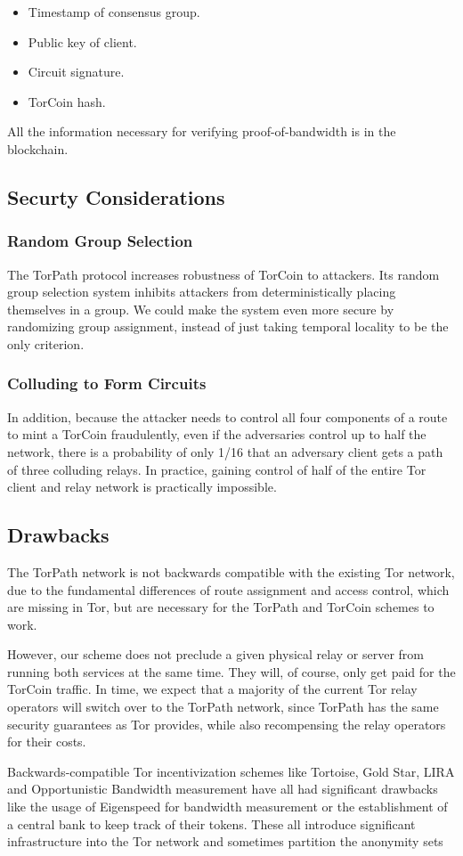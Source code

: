 \begin{itemize}
\item Timestamp of consensus group.
\item Public key of client.
\item Circuit signature.
\item TorCoin hash.
\end{itemize}

All the information necessary for verifying proof-of-bandwidth is in the blockchain. 

\subsection{Securty Considerations}

\subsubsection{Random Group Selection}
The TorPath protocol increases robustness of TorCoin to attackers. Its random group selection system inhibits attackers from deterministically placing themselves in a group. We could make the system even more secure by randomizing group assignment, instead of just taking temporal locality to be the only criterion.

\subsubsection{Colluding to Form Circuits}
In addition, because the attacker needs to control all four components of a route to mint a TorCoin fraudulently, even if the adversaries control up to half the network, there is a probability of only 1/16 that an adversary client gets a path of three colluding relays. In practice, gaining control of half of the entire Tor client and relay network is practically impossible. 

\subsection{Drawbacks}
The TorPath network is not backwards compatible with the existing Tor network, due to the fundamental differences of route assignment and access control, which are missing in Tor, but are necessary for the TorPath and TorCoin schemes to work.

However, our scheme does not preclude a given physical relay or server from running both services at the same time. They will, of course, only get paid for the TorCoin traffic. In time, we expect that a majority of the current Tor relay operators will switch over to the TorPath network, since TorPath has the same security guarantees as Tor provides, while also recompensing the relay operators for their costs.

Backwards-compatible Tor incentivization schemes like Tortoise\cite{acsac11-tortoise}, Gold Star\cite{incentives-fc10}, LIRA and Opportunistic Bandwidth measurement have all had significant drawbacks like the usage of Eigenspeed for bandwidth measurement or the establishment of a central bank to keep track of their tokens. These all introduce significant infrastructure into the Tor network and sometimes partition the anonymity sets